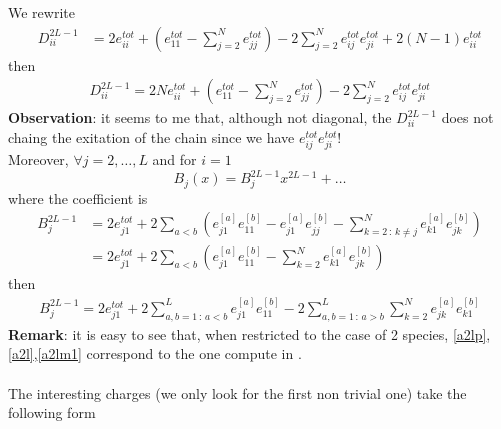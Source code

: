 \documentclass[11pt]{article}
\numberwithin{equation}{section}
\numberwithin{equation}{subsection}
\begin{document}
We rewrite
\begin{equation}
	\begin{split}
	D_{ii}^{2L-1}&=2e_{ii}^{tot}+\left(e_{11}^{tot}-\sum_{j=2}^{N}e_{jj}^{tot}\right)-2\sum_{j=2}^{N}e_{ij}^{tot}e_{ji}^{tot}+2(N-1)e_{ii}^{tot}
\end{split}
\end{equation}
then
\begin{equation}
\begin{split}
\boxed{D_{ii}^{2L-1}=	2Ne_{ii}^{tot}+\left(e_{11}^{tot}-\sum_{j=2}^{N}e_{jj}^{tot}\right)-2\sum_{j=2}^{N}e_{ij}^{tot}e_{ji}^{tot}}
	\end{split}
\end{equation}
\textbf{Observation}: it seems to me that, although not diagonal, the $D_{ii}^{2L-1}$ does not chaing the exitation of the chain since we have $e_{ij}^{tot}e_{ji}^{tot}$!\\
Moreover, $\forall j=2,\ldots,L$ and for $i=1$
\begin{equation}
	B_{j}(x)=B_{j}^{2L-1}x^{2L-1}+\ldots
\end{equation}
where the coefficient is 
\begin{equation}\label{b}
\begin{split}
	B_{j}^{2L-1}&=2e_{j1}^{tot}+2\sum_{a< b}\left(e_{j1}^{[a]}e_{11}^{[b]}-e_{j1}^{[a]}e_{jj}^{[b]}-\sum_{k=2\,:\,k\neq j}^{N}e_{k1}^{[a]}e_{jk}^{[b]}\right)\\
	&=2e_{j1}^{tot}+2\sum_{a< b}\left(e_{j1}^{[a]}e_{11}^{[b]}-\sum_{k=2}^{N}e_{k1}^{[a]}e_{jk}^{[b]}\right)
\end{split}
\end{equation}
then
\begin{equation}
\begin{split}
	\boxed{B_{j}^{2L-1}=2e_{j1}^{tot}+
	2\sum_{a,b=1\,:\, a<b}^{L}e_{j1}^{[a]}e_{11}^{[b]}-2\sum_{a,b=1\,:\, a>b}^{L}\sum_{k=2}^{N}e_{jk}^{[a]}e_{k1}^{[b]}}
\end{split}
\end{equation}
\textbf{Remark}: it is easy to see that, when restricted to the case of 2 species,  \eqref{a2lp},\eqref{a2l},\eqref{a2lm1} correspond to the one compute in \cite{frassek2020eigenstates}. \\ \\
The interesting charges (we only look for the first non trivial one) take the following form  
\end{document}
